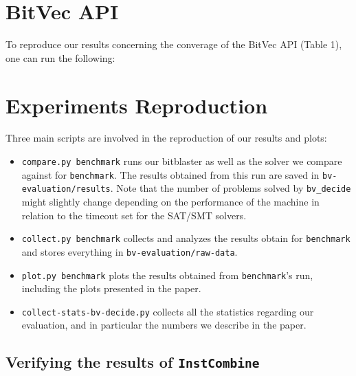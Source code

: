 \documentclass[acmlarge, nonacm]{acmart}
\begin{document}

\section{BitVec API}
To reproduce our results concerning the converage of the BitVec API (Table 1), one can run the following: 

\section{Experiments Reproduction}

Three main scripts are involved in the reproduction of our results and plots:
\begin{itemize}
  \item \texttt{compare.py benchmark} runs our bitblaster as well as the solver we compare against for \texttt{benchmark}. The results obtained from this run are saved in \texttt{bv-evaluation/results}. Note that the number of problems solved by \texttt{bv\_decide} might slightly change depending on the performance of the machine in relation to the timeout set for the SAT/SMT solvers.
  \item \texttt{collect.py benchmark} collects and analyzes the results obtain for \texttt{benchmark} and stores everything in \texttt{bv-evaluation/raw-data}. 
  \item \texttt{plot.py benchmark} plots the results obtained from \texttt{benchmark}'s run, including the plots presented in the paper. 
  \item \texttt{collect-stats-bv-decide.py} collects all the statistics regarding our evaluation, and in particular the numbers we describe in the paper.
\end{itemize}

\subsection{Verifying the results of \texttt{InstCombine}}
\end{document}
